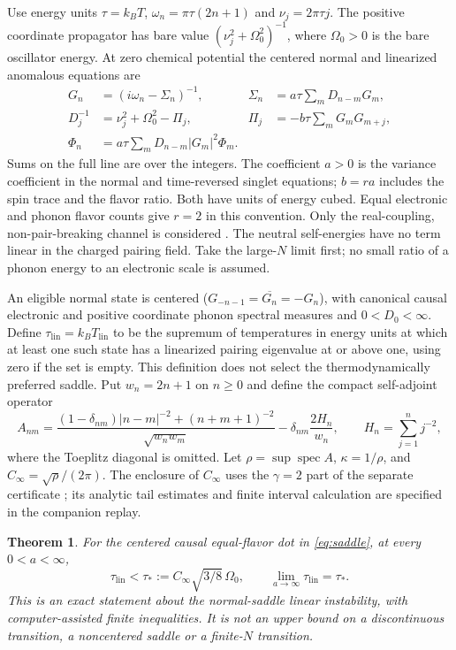 \documentclass[11pt]{article}
\newtheorem{theorem}{Theorem}
\newcommand{\spec}{\operatorname{spec}}
\newcommand{\lin}{\mathrm{lin}}
\begin{document}
Use energy units $\tau=k_BT$, $\omega_n=\pi\tau(2n+1)$ and $\nu_j=2\pi\tau j$. The positive coordinate propagator has bare value $(\nu_j^2+\Omega_0^2)^{-1}$, where $\Omega_0>0$ is the bare oscillator energy. At zero chemical potential the centered normal and linearized anomalous equations are
\begin{equation}\label{eq:saddle}
\begin{aligned}
 G_n&=(i\omega_n-\Sigma_n)^{-1},&\Sigma_n&=a\tau\sum_m D_{n-m}G_m,\\
 D_j^{-1}&=\nu_j^2+\Omega_0^2-\Pi_j,&\Pi_j&=-b\tau\sum_mG_mG_{m+j},\\
 \Phi_n&=a\tau\sum_m D_{n-m}|G_m|^2\Phi_m.&&
\end{aligned}
\end{equation}
Sums on the full line are over the integers. The coefficient $a>0$ is the variance coefficient in the normal and time-reversed singlet equations; $b=ra$ includes the spin trace and the flavor ratio. Both have units of energy cubed. Equal electronic and phonon flavor counts give $r=2$ in this convention. Only the real-coupling, non-pair-breaking channel is considered \cite{ES,Hauck}. The neutral self-energies have no term linear in the charged pairing field. Take the large-$N$ limit first; no small ratio of a phonon energy to an electronic scale is assumed.

An eligible normal state is centered ($G_{-n-1}=\overline{G_n}=-G_n$), with canonical causal electronic and positive coordinate phonon spectral measures and $0<D_0<\infty$. Define $\tau_{\lin}=k_BT_{\lin}$ to be the supremum of temperatures in energy units at which at least one such state has a linearized pairing eigenvalue at or above one, using zero if the set is empty. This definition does not select the thermodynamically preferred saddle. Put $w_n=2n+1$ on $n\ge0$ and define the compact self-adjoint operator
\begin{equation}\label{eq:gamma}
 A_{nm}=\frac{(1-\delta_{nm})|n-m|^{-2}+(n+m+1)^{-2}}{\sqrt{w_nw_m}}-\delta_{nm}\frac{2H_n}{w_n},\qquad H_n=\sum_{j=1}^{n}j^{-2},
\end{equation}
where the Toeplitz diagonal is omitted. Let $\rho=\sup\spec A$, $\kappa=1/\rho$, and $C_\infty=\sqrt{\rho}/(2\pi)$. The enclosure of $C_\infty$ uses the $\gamma=2$ part of the separate certificate \cite{GammaCert}; its analytic tail estimates and finite interval calculation are specified in the companion replay.

\begin{theorem}\label{thm:main}
For the centered causal equal-flavor dot in \eqref{eq:saddle}, at every $0<a<\infty$,
\[
 \tau_{\lin}<\tau_*:=C_\infty\sqrt{3/8}\,\Omega_0,
 \qquad \lim_{a\to\infty}\tau_{\lin}=\tau_*.
\]
This is an exact statement about the normal-saddle linear instability, with computer-assisted finite inequalities. It is not an upper bound on a discontinuous transition, a noncentered saddle or a finite-$N$ transition.
\end{theorem}
\end{document}
